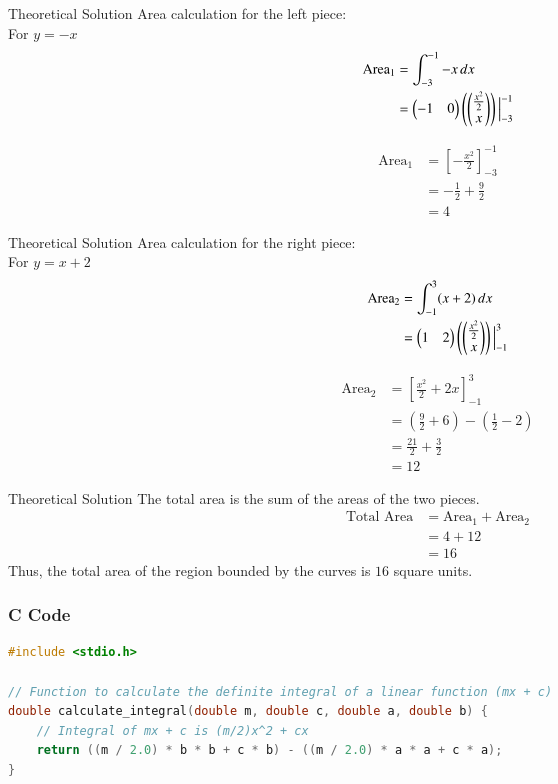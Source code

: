 \documentclass{beamer}
\begin{document}
\begin{frame}{Theoretical Solution}
Area calculation for the left piece:\\
For $y=-x$ 
\begin{align}
    \text{Area}_1 &= \int_{-3}^{-1} -x \,dx \\
    &= \begin{pmatrix}-1 & 0\end{pmatrix} \left( \begin{pmatrix}\tfrac{x^2}{2} \\ x\end{pmatrix} \right) \Big|_{-3}^{-1}
\end{align}

\begin{align}
    \text{Area}_1 &= \left[ -\frac{x^2}{2} \right]_{-3}^{-1} \\
    &= -\frac{1}{2} + \frac{9}{2} \\
    &= 4
\end{align}
\end{frame}

\begin{frame}{Theoretical Solution}
Area calculation for the right piece:\\
For $y=x+2$
\begin{align}
    \text{Area}_2 &= \int_{-1}^{3} (x+2) \,dx \\
    &= \begin{pmatrix}1 & 2\end{pmatrix} \left( \begin{pmatrix}\tfrac{x^2}{2} \\ x\end{pmatrix} \right) \Big|_{-1}^{3}
\end{align}

\begin{align}
    \text{Area}_2 &= \left[ \frac{x^2}{2} + 2x \right]_{-1}^{3} \\
    &= \left( \frac{9}{2} + 6 \right) - \left( \frac{1}{2} - 2 \right) \\
    &= \frac{21}{2} + \frac{3}{2} \\
    &= 12
\end{align}
\end{frame}

\begin{frame}{Theoretical Solution}
The total area is the sum of the areas of the two pieces.
\begin{align}
    \text{Total Area} &= \text{Area}_1 + \text{Area}_2 \\
    &= 4 + 12 \\
    &= 16
\end{align}
Thus, the total area of the region bounded by the curves is $16$ square units.
\end{frame}

\begin{frame}[fragile]
\frametitle{C Code}
\begin{lstlisting}[language=C]
#include <stdio.h>

// Function to calculate the definite integral of a linear function (mx + c)
double calculate_integral(double m, double c, double a, double b) {
    // Integral of mx + c is (m/2)x^2 + cx
    return ((m / 2.0) * b * b + c * b) - ((m / 2.0) * a * a + c * a);
}
\end{lstlisting}
\end{frame}
\end{document}
